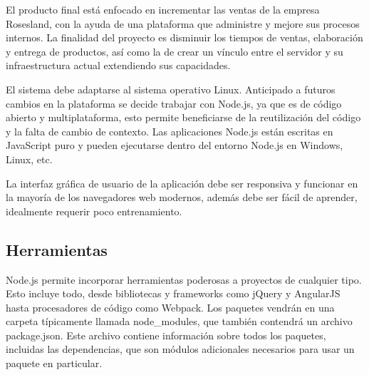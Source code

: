 El producto final está enfocado en incrementar las ventas de la empresa Rosesland, con la ayuda de una plataforma que administre y mejore sus procesos internos. La finalidad del proyecto es disminuir los tiempos de ventas, elaboración y entrega de productos, así como la de crear un vínculo entre el servidor y su infraestructura actual extendiendo sus capacidades.
\vspace{0.8cm}

El sistema debe adaptarse al sistema operativo Linux. Anticipado a futuros cambios en la plataforma se decide trabajar con Node.js, ya que es de código abierto y multiplataforma, esto permite beneficiarse de la reutilización del código y la falta de cambio de contexto. Las aplicaciones Node.js están escritas en JavaScript puro y pueden ejecutarse dentro del entorno Node.js en Windows, Linux, etc.
\vspace{0.8cm}

La interfaz gráfica de usuario de la aplicación debe ser responsiva y funcionar en la mayoría de los navegadores web modernos, además debe ser fácil de aprender, idealmente requerir poco entrenamiento.
\vspace{0.8cm}

\subsection{Herramientas}
Node.js permite incorporar herramientas poderosas a proyectos de cualquier tipo. Esto incluye todo, desde bibliotecas y \glspl{framework} como jQuery y AngularJS hasta procesadores de código como Webpack. Los paquetes vendrán en una carpeta típicamente llamada node\_modules, que también contendrá un archivo package.json. Este archivo contiene información sobre todos los paquetes, incluidas las dependencias, que son módulos adicionales necesarios para usar un paquete en particular.

